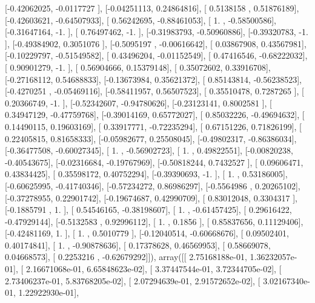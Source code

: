 \documentclass{article}
\begin{document}
       [-0.42062025, -0.0117727 ],
       [-0.04251113,  0.24864816],
       [ 0.5138158 ,  0.51876189],
       [-0.42603621, -0.64507933],
       [ 0.56242695, -0.88461053],
       [ 1.        , -0.58500586],
       [-0.31647164, -1.        ],
       [ 0.76497462, -1.        ],
       [-0.31983793, -0.50960886],
       [-0.39320783, -1.        ],
       [-0.49384902,  0.3051076 ],
       [-0.5095197 , -0.00616642],
       [ 0.03867908,  0.43567981],
       [-0.10229797, -0.51549582],
       [ 0.43496204, -0.01152549],
       [ 0.47416546, -0.68222032],
       [ 0.90901279, -1.        ],
       [ 0.56904666,  0.15379148],
       [ 0.35072602,  0.33916708],
       [-0.27168112,  0.54688833],
       [-0.13673984,  0.35621372],
       [ 0.85143814, -0.56238523],
       [-0.4270251 , -0.05469116],
       [-0.58411957,  0.56507523],
       [ 0.35510478,  0.7287265 ],
       [ 0.20366749, -1.        ],
       [-0.52342607, -0.94780626],
       [-0.23123141,  0.8002581 ],
       [ 0.34947129, -0.47759768],
       [-0.39014169,  0.65772027],
       [ 0.85032226, -0.49694632],
       [ 0.14490115,  0.19603169],
       [ 0.33917771, -0.72235294],
       [ 0.67151226,  0.71826199],
       [ 0.22405815,  0.81658333],
       [-0.05982677,  0.25508045],
       [-0.49802317, -0.86386034],
       [-0.36477508, -0.60027345],
       [ 1.        , -0.56902723],
       [ 1.        ,  0.49822551],
       [-0.00820238, -0.40543675],
       [-0.02316684, -0.19767969],
       [-0.50818244,  0.7432527 ],
       [ 0.09606471,  0.43834425],
       [ 0.35598172,  0.40752294],
       [-0.39390693, -1.        ],
       [ 1.        ,  0.53186005],
       [-0.60625995, -0.41740346],
       [-0.57234272,  0.86986297],
       [-0.5564986 ,  0.20265102],
       [-0.37278955,  0.22901742],
       [-0.19674687,  0.42990709],
       [ 0.83012048,  0.3304317 ],
       [-0.1885791 ,  1.        ],
       [ 0.54546165, -0.38198607],
       [ 1.        , -0.61457425],
       [ 0.29616422, -0.47929144],
       [-0.5132583 ,  0.92996112],
       [ 1.        ,  0.1856    ],
       [ 0.85837656,  0.11129406],
       [-0.42481169,  1.        ],
       [ 1.        ,  0.5010779 ],
       [-0.12040514, -0.60668676],
       [ 0.09502401,  0.40174841],
       [ 1.        , -0.90878636],
       [ 0.17378628,  0.46569953],
       [ 0.58669078,  0.04668573],
       [ 0.2253216 , -0.62679292]]), array([[ 2.75168188e-01,  1.36232057e-01],
       [ 2.16671068e-01,  6.65848623e-02],
       [ 3.37447544e-01,  3.72344705e-02],
       [ 2.73406237e-01,  5.83768205e-02],
       [ 2.07294639e-01,  2.91572652e-02],
       [ 3.02167340e-01,  1.22922930e-01],
\end{document}
